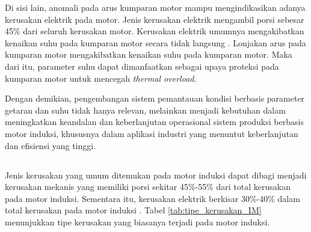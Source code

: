 \documentclass{elsinta}
\begin{document}
Di sisi lain, anomali pada arus kumparan motor mampu
mengindikasikan adanya kerusakan elektrik pada motor.
Jenis kerusakan elektrik mengambil porsi sebesar
45\% dari seluruh kerusakan motor\cite{Filho2025}.
Kerusakan elektrik umumnya mengakibatkan kenaikan suhu
pada kumparan motor secara tidak langsung \cite{Filho2025}. Lonjakan
arus pada kumparan motor mengakibatkan kenaikan suhu pada
kumparan motor\cite{Filho2025}. Maka dari itu,
parameter suhu dapat dimanfaatkan sebagai
upaya proteksi pada kumparan motor untuk mencegah
\textit{thermal overload}\cite{Gedzurs2015}.

Dengan demikian, pengembangan sistem pemantauan
kondisi berbasis parameter getaran dan suhu 
tidak hanya relevan, melainkan menjadi 
kebutuhan dalam meningkatkan keandalan dan 
keberlanjutan operasional sistem produksi 
berbasis motor induksi, khususnya dalam 
aplikasi industri yang menuntut keberlanjutan 
dan efisiensi yang tinggi.

\subsection{\ExistingConditionTitle}
Jenis kerusakan yang umum ditemukan pada motor induksi
dapat dibagi menjadi kerusakan mekanis yang memiliki
porsi sekitar 45\%-55\% dari total kerusakan pada motor induksi\cite{Gangsar2020}. Sementara itu, kerusakan elektrik
berkisar 30\%-40\% dalam total kerusakan pada motor induksi \cite{Gangsar2020}.
Tabel \ref{tab:tipe_kerusakan_IM} menunjukkan tipe kerusakan
yang biasanya terjadi pada motor induksi.
\end{document}
